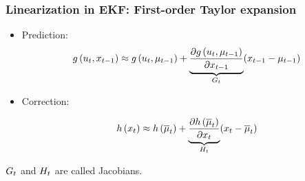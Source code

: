     \begin{frame}
     \frametitle{Linearization in EKF: First-order Taylor expansion}
    
    
     \begin{itemize}
     \item Prediction:
     \begin{equation*}
     g\left( u_{t}, x _{t-1} \right) \approx g\left( u_{t}, \mu _{t-1} \right) + \underbrace{\dfrac{\partial g\left( u_{t}, \mu _{t-1} \right)}{\partial x _{t-1}}}_{G_{t}} (x_{t-1} - \mu_{t-1})
     \end{equation*}
    
     \item Correction:
    
     \begin{equation*}
     h\left( x_{t} \right) \approx h\left( \overline{\mu}_{t} \right) + \underbrace{\dfrac{\partial h\left( \overline{\mu}_{t} \right)}{\partial x_{t}}}_{H_{t}} (x_{t} - \overline{\mu}_{t})
     \end{equation*}
    
     \end{itemize}
    
     $G_{t}$ and $H_{t}$ are called Jacobians.
    \end{frame}
    
